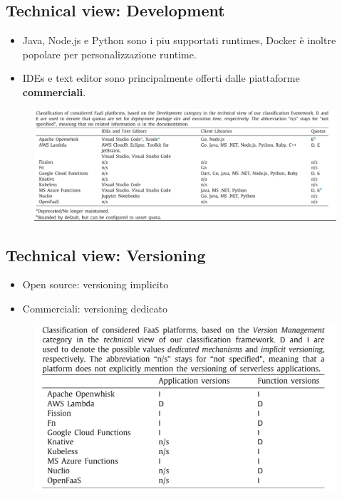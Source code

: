 \documentclass[a4paper, 12pt]{report}
\begin{document}
            \subsection{Technical view: Development}
            \begin{itemize}
              \item Java, Node.js e Python sono i piu supportati runtimes, Docker è inoltre popolare per personalizzazione runtime. 
              \item IDEs e text editor sono principalmente offerti dalle piattaforme \textbf{commerciali}.
            \end{itemize}
            \begin{figure}[h]
              \centering
              \includegraphics[scale=0.35]{Immagini/Development.png}
            \end{figure}
            \subsection{Technical view: Versioning}
            \begin{itemize}
              \item Open source: versioning implicito
              \item Commerciali: versioning dedicato
            \end{itemize}
            \begin{figure}[h]
              \centering
              \includegraphics[scale=0.5]{Immagini/Versioing.png}
            \end{figure}
\end{document}
